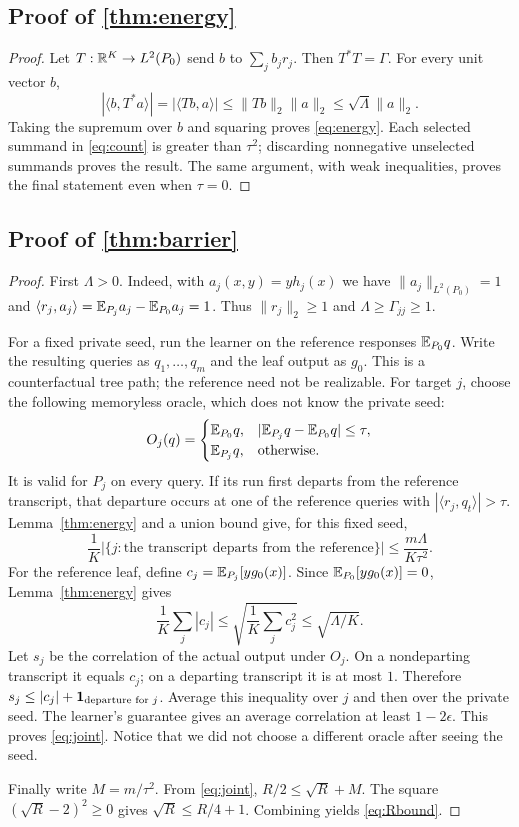 \subsection[Proof of result energy]{Proof of \cref{thm:energy}}\label{proof:energy}
\begin{proof}
Let $T:\mathbb R^K\to L^2(P_0)$ send $b$ to $\sum_jb_jr_j$. Then $T^*T=\Gamma$. For every unit vector $b$,
\[
 |\langle b,T^*a\rangle|=|\langle Tb,a\rangle|
 \leq\|Tb\|_2\|a\|_2\leq\sqrt\Lambda\|a\|_2.
\]
Taking the supremum over $b$ and squaring proves \eqref{eq:energy}. Each selected summand in \eqref{eq:count} is greater than $\tau^2$; discarding nonnegative unselected summands proves the result. The same argument, with weak inequalities, proves the final statement even when $\tau=0$.
\end{proof}

\subsection[Proof of result barrier]{Proof of \cref{thm:barrier}}\label{proof:barrier}
\begin{proof}
First $\Lambda>0$. Indeed, with $a_j(x,y)=y h_j(x)$ we have $\|a_j\|_{L^2(P_0)}=1$ and
$\langle r_j,a_j\rangle=\mathbb E_{P_j}a_j-\mathbb E_{P_0}a_j=1$. Thus $\|r_j\|_2\geq1$ and $\Lambda\geq\Gamma_{jj}\geq1$.

For a fixed private seed, run the learner on the reference responses $\mathbb E_{P_0}q$. Write the resulting queries as $q_1,\ldots,q_m$ and the leaf output as $g_0$. This is a counterfactual tree path; the reference need not be realizable. For target $j$, choose the following memoryless oracle, which does not know the private seed:
\[
 O_j(q)=
 \begin{cases}
 \mathbb E_{P_0}q,&|\mathbb E_{P_j}q-\mathbb E_{P_0}q|\leq\tau,\\
 \mathbb E_{P_j}q,&\text{otherwise}.
 \end{cases}
\]
It is valid for $P_j$ on every query. If its run first departs from the reference transcript, that departure occurs at one of the reference queries with $|\langle r_j,q_t\rangle|>\tau$. Lemma~\ref{thm:energy} and a union bound give, for this fixed seed,
\[
 \frac1K\bigl|\{j:\text{the transcript departs from the reference}\}\bigr|
 \leq\frac{m\Lambda}{K\tau^2}.
\]
For the reference leaf, define $c_j=\mathbb E_{P_j}[y g_0(x)]$. Since $\mathbb E_{P_0}[y g_0(x)]=0$, Lemma~\ref{thm:energy} gives
\[
 \frac1K\sum_j|c_j|\leq
 \sqrt{\frac1K\sum_jc_j^2}\leq\sqrt{\Lambda/K}.
\]
Let $s_j$ be the correlation of the actual output under $O_j$. On a nondeparting transcript it equals $c_j$; on a departing transcript it is at most $1$. Therefore
$s_j\leq|c_j|+\mathbf 1_{\text{departure for }j}$.
Average this inequality over $j$ and then over the private seed. The learner's guarantee gives an average correlation at least $1-2\epsilon$. This proves \eqref{eq:joint}. Notice that we did not choose a different oracle after seeing the seed.

Finally write $M=m/\tau^2$. From \eqref{eq:joint}, $R/2\leq\sqrt R+M$. The square $(\sqrt R-2)^2\geq0$ gives $\sqrt R\leq R/4+1$. Combining yields \eqref{eq:Rbound}.
\end{proof}

